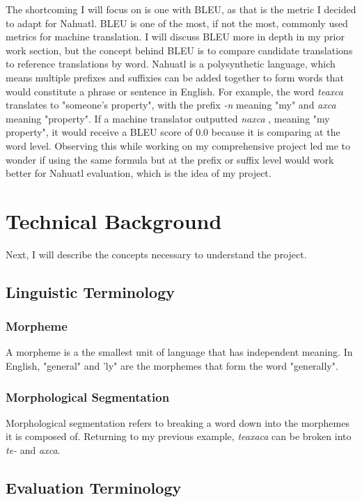 \documentclass[10pt,twocolumn]{article}
\begin{document}
The shortcoming I will focus on is one with BLEU, as that is the metric I decided to adapt for Nahuatl. BLEU is one of the most, if not the most, commonly used  metrics for machine translation. I will discuss BLEU more in depth in my prior work section, but the concept behind BLEU is to compare candidate translations to reference translations by word. Nahuatl is a polysynthetic language, which means multiple prefixes and suffixies can be added together to form words that would constitute a phrase or sentence in English. For example,  the word \textit{teaxca} translates to "someone's property", with the prefix \textit{-n} meaning "my" and \textit{axca} meaning "property". If a machine translator outputted \textit{naxca} , meaning "my property", it would receive a BLEU score of 0.0 because it is comparing at the word level. Observing this while working on my comprehensive project led me to wonder if using the same formula but at the prefix or suffix level would work better for Nahuatl evaluation, which is the idea of my project.

\section{Technical Background}

Next, I will describe the concepts necessary to understand the project. 

\subsection{Linguistic Terminology}

\subsubsection{Morpheme}

A morpheme is a the smallest unit of language that has independent meaning. In English, "general" and 'ly" are the morphemes that form the word "generally". \cite{Polysynethic}

\subsubsection{Morphological Segmentation}
Morphological segmentation refers to breaking a word down into the morphemes it is composed of. Returning to my previous example, \textit{teaxaca} can be broken into \textit{te-} and \textit{axca}.

\subsection{Evaluation Terminology}
\end{document}
